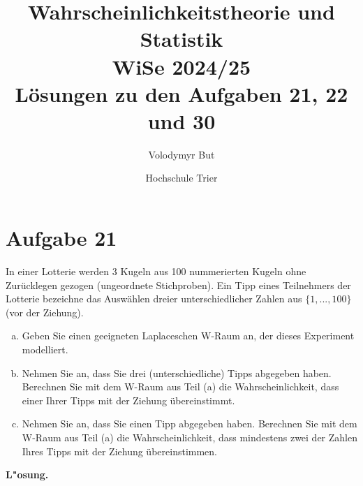 \documentclass[10pt, oneside]{article}
\title{Wahrscheinlichkeitstheorie und Statistik\\[10pt]\Large WiSe 2024/25\\[15pt]\Large L{\"o}sungen zu den Aufgaben 21, 22 und 30}
\author{Volodymyr But}
\date{Hochschule Trier}
\begin{document}
\sloppy

\maketitle
\vspace{25px}

\section{Aufgabe 21}
\setcounter{section}{21}
In einer Lotterie werden 3 Kugeln aus 100 nummerierten Kugeln ohne Zurücklegen
gezogen (ungeordnete Stichproben). Ein Tipp eines Teilnehmers der Lotterie
bezeichne das Auswählen dreier unterschiedlicher Zahlen aus $\{1,...,100\}$
(vor der Ziehung).
\begin{enumerate}[(a)]
    \item Geben Sie einen geeigneten Laplaceschen W-Raum an, der dieses
        Experiment modelliert.
    \item Nehmen Sie an, dass Sie drei (unterschiedliche) Tipps abgegeben haben.
        Berechnen Sie mit dem W-Raum aus Teil (a) die Wahrscheinlichkeit, dass
        einer Ihrer Tipps mit der Ziehung übereinstimmt.
    \item Nehmen Sie an, dass Sie einen Tipp abgegeben haben. Berechnen Sie mit dem
        W-Raum aus Teil (a) die Wahrscheinlichkeit, dass mindestens zwei der
        Zahlen Ihres Tipps mit der Ziehung übereinstimmen.
\end{enumerate}
\textbf{L"osung.}
\end{document}
